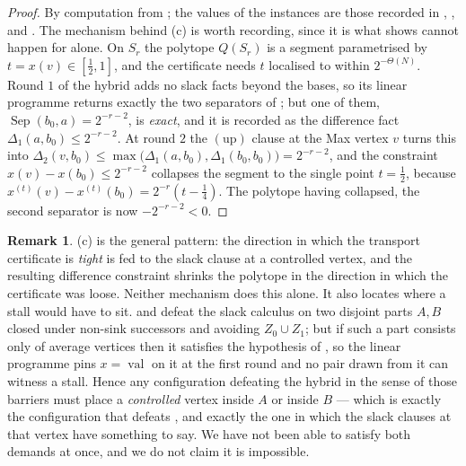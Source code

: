 \documentclass[11pt]{article}
\theoremstyle{plain}
\theoremstyle{definition}
\newtheorem{remark}[theorem]{Remark}
\DeclareMathOperator{\val}{val}
\begin{document}
\begin{proof}
By computation from ; the values of the instances are
those recorded in , ,
 and . The
mechanism behind (c) is worth recording, since it is what
 shows cannot happen for
 alone. On $S_r$ the polytope $Q(S_r)$ is a segment
parametrised by $t=x(v)\in[\tfrac12,1]$, and the certificate needs
$t$ localised to within $2^{-\Theta(N)}$. Round $1$ of the hybrid adds no
slack facts beyond the bases, so its linear programme returns exactly the
two separators of ; but one of them,
$\operatorname{Sep}(b_0,a)=2^{-r-2}$, is \emph{exact}, and it is recorded
as the difference fact $\Delta_1(a,b_0)\le2^{-r-2}$. At round $2$ the
$(\mathrm{up})$ clause at the Max vertex $v$ turns this into
$\Delta_2(v,b_0)\le\max\bigl(\Delta_1(a,b_0),\Delta_1(b_0,b_0)\bigr)=2^{-r-2}$,
and the constraint $x(v)-x(b_0)\le2^{-r-2}$ collapses the segment to the
single point $t=\tfrac12$, because $x^{(t)}(v)-x^{(t)}(b_0)=2^{-r}(t-\tfrac14)$.
The polytope having collapsed, the second separator is now $-2^{-r-2}<0$.
\end{proof}

\begin{remark}\label{rem:hybrid-where}
(c) is the general pattern: the direction in
which the transport certificate is \emph{tight} is fed to the slack
clause at a controlled vertex, and the resulting difference constraint
shrinks the polytope in the direction in which the certificate was loose.
Neither mechanism does this alone. It also locates where a stall would
have to sit.  and 
defeat the slack calculus on two disjoint parts $A,B$ closed under
non-sink successors and avoiding $Z_0\cup Z_1$; but if such a part
consists only of average vertices then it satisfies the hypothesis of
, so the linear programme pins $x=\val$ on it
at the first round and no pair drawn from it can witness a stall. Hence
any configuration defeating the hybrid in the sense of those barriers
must place a \emph{controlled} vertex inside $A$ or inside $B$ --- which
is exactly the configuration that defeats , and
exactly the one in which the slack clauses at that vertex have something
to say. We have not been able to satisfy both demands at once, and we do
not claim it is impossible.
\end{remark}
\end{document}
